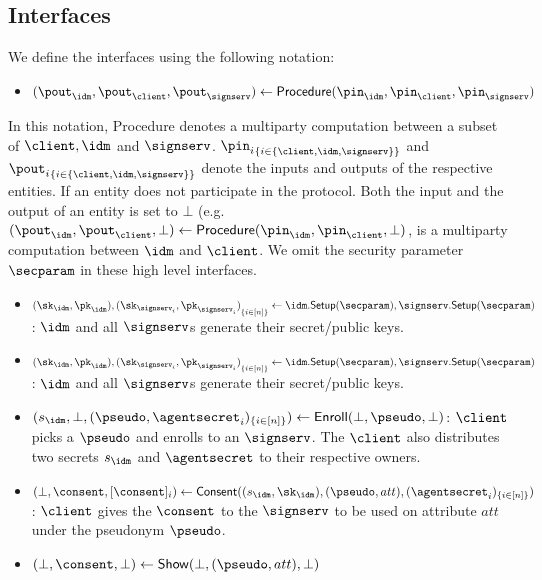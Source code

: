 \subsection{Interfaces}
We define the interfaces using the following notation:
\begin{itemize}
    \item $(\pout_\idm, \pout_\client, \pout_\signserv) \gets \mathsf{Procedure}(\pin_\idm, \pin_\client, \pin_\signserv)$
\end{itemize}

In this notation, \textsf{Procedure} denotes a multiparty computation between a subset of $\client, \idm$ and $\signserv$. ${\pin_{i}}_{\{i \in \{\client, \idm, \signserv\}\}}$ and ${\pout_{i}}_{\{i \in \{\client, \idm, \signserv\}\}}$ denote the inputs and outputs of the respective entities. If an entity does not participate in the protocol. Both the input and the output of an entity is set to $\bot$ (e.g. $(\pout_\idm, \pout_\client, \bot) \gets \mathsf{Procedure}(\pin_\idm, \pin_\client, \bot)$, is a multiparty computation between $\idm$ and $\client$. We omit the security parameter $\secparam$ in these high level interfaces.

\begin{itemize}
    \item $(\sk_\idm, \pk_\idm), {(\sk_{\signserv_i},\pk_{\signserv_i})}_{\{i \in [n]\}} \gets \idm.\mathsf{Setup}(\secparam), \signserv.\mathsf{Setup}(\secparam)$: $\idm$ and all $\signserv$s generate their secret/public keys.
    \item $(\sk_\idm, \pk_\idm), {(\sk_{\signserv_i},\pk_{\signserv_i})}_{\{i \in [n]\}} \gets \idm.\mathsf{Setup}(\secparam), \signserv.\mathsf{Setup}(\secparam)$: $\idm$ and all $\signserv$s generate their secret/public keys.
    \item $(s_\idm, \bot, (\pseudo, {\agentsecret}_i)_{\{i \in [n]\}}) \gets \mathsf{Enroll}(\bot, \pseudo, \bot)$: $\client$ picks a $\pseudo$ and enrolls to an $\signserv$. The $\client$ also distributes two secrets $s_\idm$ and $\agentsecret$ to their respective owners.
    \item $(\bot, \consent, [\consent]_i) \gets \mathsf{Consent}((s_\idm, \sk_\idm), (\pseudo, att), ({\agentsecret}_i)_{\{i \in [n]\}})$: $\client$ gives the $\consent$ to the $\signserv$ to be used on attribute $att$ under the pseudonym $\pseudo$.
    \item $(\bot, \consent, \bot) \gets \mathsf{Show}(\bot, (\pseudo, att), \bot )$
\end{itemize}

